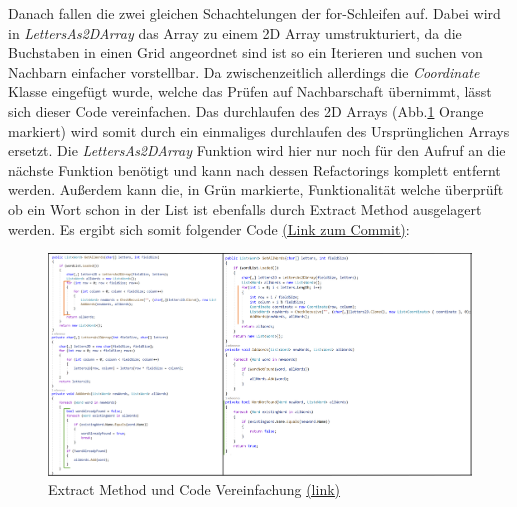 Danach fallen die zwei gleichen Schachtelungen der for-Schleifen auf. Dabei wird in \textit{LettersAs2DArray} das Array zu einem 2D Array umstrukturiert, da die Buchstaben in einen Grid angeordnet sind ist so ein Iterieren und suchen von Nachbarn einfacher vorstellbar. Da zwischenzeitlich allerdings die \textit{Coordinate} Klasse eingefügt wurde, welche das Prüfen auf Nachbarschaft übernimmt, lässt sich dieser Code vereinfachen. Das durchlaufen des 2D Arrays (Abb.\ref{Abb:CodeVereinfachen} Orange markiert) wird somit durch ein einmaliges durchlaufen des Ursprünglichen Arrays ersetzt. Die \textit{LettersAs2DArray} Funktion wird hier nur noch für den Aufruf an die nächste Funktion benötigt und kann nach dessen Refactorings komplett entfernt werden. Außerdem kann die, in Grün markierte, Funktionalität welche überprüft ob ein Wort schon in der List ist ebenfalls durch Extract Method ausgelagert werden. Es ergibt sich somit folgender Code \href{https://github.com/EinToni/Wortfinder/commit/f733dabc6753529e597408cc8c76ea0a39a1ff8e}{(Link zum Commit)}:

\begin{figure}[!ht]
  \centering
  \includegraphics[width=\textwidth]{Bilder/CodeVereinfachen.PNG}
  \caption[Extract Method und Code Vereinfachung]{Extract Method und Code Vereinfachung \href{https://github.com/EinToni/WortfinderDoku/blob/main/Bilder/CodeVereinfachen.png}{(link)}}
  \label{Abb:CodeVereinfachen}
\end{figure}

